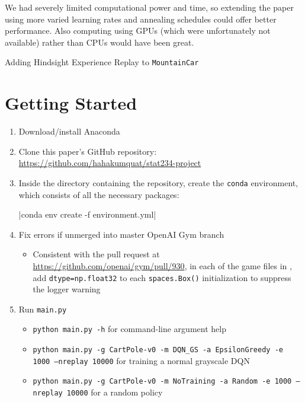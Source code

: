 \documentclass[11pt]{article}
\newcommand{\mc}{\texttt{MountainCar}}
\begin{document}
We had severely limited computational power and time, so extending the paper using more varied learning rates and annealing schedules could offer better performance. Also computing using GPUs (which were unfortunately not available) rather than CPUs would have been great.

Adding Hindsight Experience Replay to \mc

\newpage
{}


\newpage

\appendix

\section{Getting Started}
\label{app:getting_started}

\begin{enumerate}
    \item Download/install Anaconda
    
    \item Clone this paper's GitHub repository: \url{https://github.com/hahakumquat/stat234-project}
    
    \item Inside the directory containing the repository, create the \texttt{conda} environment, which consists of all the necessary packages: 
    
    |conda env create -f environment.yml|

    \item Fix errors if unmerged into master OpenAI Gym branch
    
    \begin{itemize}
        \item Consistent with the pull request at \url{https://github.com/openai/gym/pull/930}, in each of the game files in , add \texttt{dtype=np.float32} to each \texttt{spaces.Box()} initialization to suppress the logger warning
    \end{itemize}
    
    \item Run \texttt{main.py}
    
    \begin{itemize}
        \item \texttt{python main.py -h} for command-line argument help
        \item \texttt{python main.py -g CartPole-v0 -m DQN\_GS -a EpsilonGreedy -e 1000 --nreplay 10000} for training a normal grayscale DQN
        \item \texttt{python main.py -g CartPole-v0 -m NoTraining -a Random -e 1000 --nreplay 10000} for a random policy
    \end{itemize}
\end{enumerate}
\end{document}
